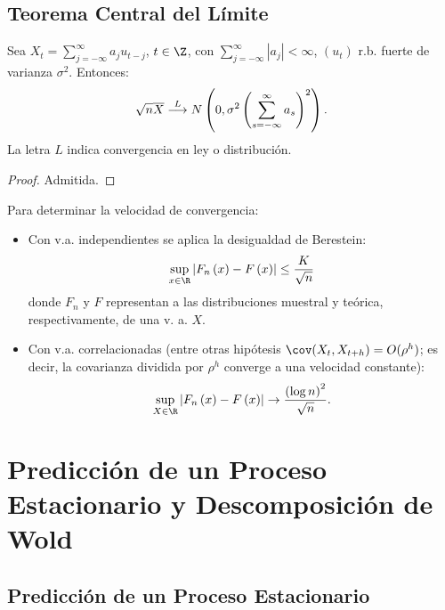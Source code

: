 \subsection{Teorema Central del L\'{i}mite}

\begin{teorema}
Sea $\displaystyle X_{t} =\sum_{j=-\infty }^\infty {a_{j} 
u_{t-j} }$, $t\in \Z$, con $\displaystyle\sum_{j=-\infty}^\infty {\left| {a_{j} } \right|} <\infty$, $\left( {u_{t} } \right)$ r.b. fuerte de varianza $\sigma^{2}$. Entonces: 
\[
\sqrt n \overline{{X}}\buildrel L \over \longrightarrow N\left( {0,\sigma 
^{2}\left( {\sum_{s=-\infty }^\infty {a_{s} } } \right)^{2}} \right).
\]
La letra $L$ indica convergencia en ley o distribuci\'{o}n.
\end{teorema}

\begin{proof}
 Admitida.
\end{proof}

\begin{observacion}
Para determinar la velocidad de convergencia:
\begin{itemize}
\item Con v.a. independientes se aplica la desigualdad de Berestein:
\[
\sup_{x\in \R} \left| {F_{n} \left( x \right)-F\left( x 
\right)} \right|\leq \frac{K}{\sqrt n }
\]
donde $F_{n} $ y $F$ representan a las distribuciones muestral y te\'{o}rica, 
respectivamente, de una v. a. $X$. 

\item Con v.a. correlacionadas (entre otras hip\'{o}tesis $\cov(X_{t} ,X_{t+h} )=O(\rho^{h})$; es decir, la covarianza dividida por $\rho^{h}$ converge a una velocidad constante):
\[
\sup_{X\in \R} \left| {F_{n} \left( x \right)-F\left( x \right)} 
\right|\to \frac{\left( {\log n} \right)^{2}}{\sqrt n }.
\]
\end{itemize}
\end{observacion}


\section{Predicci\'{o}n de un Proceso Estacionario y Descomposici\'{o}n de Wold}
\label{subsec:mylabel5}
\subsection{Predicci\'{o}n de un Proceso Estacionario}
\label{subsubsec:mylabel3}


